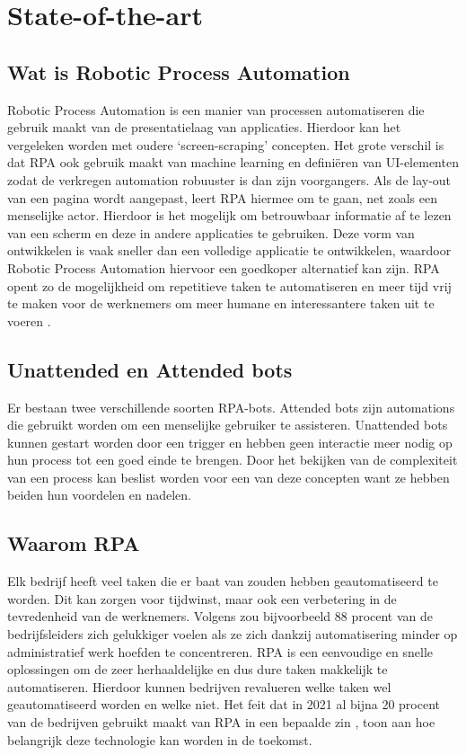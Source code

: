 
\section{State-of-the-art}%
\label{sec:state-of-the-art}

\subsection{Wat is Robotic Process Automation}
\label{Wat is Robotic Process Automation}
Robotic Process Automation is een manier van processen automatiseren die gebruik maakt van de presentatielaag van applicaties. Hierdoor kan het vergeleken worden met oudere ‘screen-scraping’ concepten. Het grote verschil is dat RPA ook gebruik maakt van machine learning en definiëren van UI-elementen zodat de verkregen automation robuuster is dan zijn voorgangers. 
Als de lay-out van een pagina wordt aangepast, leert RPA hiermee om te gaan, net zoals een menselijke actor. Hierdoor is het mogelijk om betrouwbaar informatie af te lezen van een scherm en deze in andere applicaties te gebruiken. Deze vorm van ontwikkelen is vaak sneller dan een volledige applicatie te ontwikkelen, waardoor Robotic Process Automation hiervoor een goedkoper alternatief kan zijn. RPA opent zo de mogelijkheid om repetitieve taken te automatiseren en meer tijd vrij te maken voor de werknemers om meer humane en interessantere taken uit te voeren \autocite{Panikkar2022}.

\subsection{Unattended en Attended bots}
\label{Unattended en Attended bots}
Er bestaan twee verschillende soorten RPA-bots. Attended bots zijn automations die gebruikt worden om een menselijke gebruiker te assisteren. 
Unattended bots kunnen gestart worden door een trigger en hebben geen interactie meer nodig op hun process tot een goed einde te brengen. Door het bekijken van de complexiteit van een process kan beslist worden voor een van deze concepten want ze hebben beiden hun voordelen en nadelen.

\subsection{Waarom RPA}
\label{Waarom RPA}
Elk bedrijf heeft veel taken die er baat van zouden hebben geautomatiseerd te worden. Dit kan zorgen voor tijdwinst, maar ook een verbetering in de tevredenheid van de werknemers. Volgens \textcite{blueprism2023} zou bijvoorbeeld 88 procent van de bedrijfsleiders zich gelukkiger voelen als ze zich dankzij automatisering minder op administratief werk hoefden te concentreren. RPA is een eenvoudige en snelle oplossingen om de zeer herhaaldelijke en dus dure taken makkelijk te automatiseren. Hierdoor kunnen bedrijven revalueren welke taken wel geautomatiseerd worden en welke niet. Het feit dat in 2021 al bijna 20 procent van de bedrijven gebruikt maakt van RPA in een bepaalde zin \autocite{CemDilmegani2023}, toon aan hoe belangrijk deze technologie kan worden in de toekomst.

